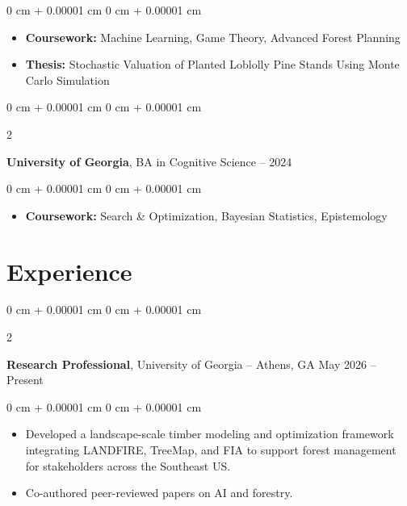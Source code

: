\documentclass[10pt, letterpaper]{article}
\newenvironment{highlights}{
    \begin{itemize}[
        topsep=0.10 cm,
        parsep=0.10 cm,
        partopsep=0pt,
        itemsep=0pt,
        leftmargin=0 cm + 10pt
    ]
}{
    \end{itemize}
} %
\newenvironment{onecolentry}{
    \begin{adjustwidth}{
        0 cm + 0.00001 cm
    }{
        0 cm + 0.00001 cm
    }
}{
    \end{adjustwidth}
} %
\newenvironment{twocolentry}[2][]{
    \onecolentry
    \def\secondColumn{#2}
    \setcolumnwidth{\fill, 4.5 cm}
    \begin{paracol}{2}
}{
    \switchcolumn \raggedleft \secondColumn
    \end{paracol}
    \endonecolentry
} %
\begin{document}
    \vspace{0.10 cm}
        \begin{onecolentry}
            \begin{highlights}
                \item \textbf{Coursework:} Machine Learning, Game Theory, Advanced Forest Planning
                \item \textbf{Thesis:} Stochastic Valuation of Planted Loblolly Pine Stands Using Monte Carlo Simulation
            \end{highlights}
        \end{onecolentry}

        \vspace{0.10 cm}
        \begin{twocolentry}{
            2020 -- 2024
        }
            \textbf{University of Georgia}, BA in Cognitive Science \end{twocolentry}  
            

        \vspace{0.10 cm}
        \begin{onecolentry}
            \begin{highlights}
                \item \textbf{Coursework:} Search \& Optimization, Bayesian Statistics, Epistemology
            \end{highlights}
        \end{onecolentry}
    \vspace{0.10 cm}

    
    \section{Experience}


        \vspace{0.2 cm}
        \begin{twocolentry}{
            May 2026 -- Present
        }
            \textbf{Research Professional}, University of Georgia -- Athens, GA\end{twocolentry}

        \vspace{0.10 cm}
        \begin{onecolentry}
            \begin{highlights}
                \item Developed a landscape-scale timber modeling and optimization framework integrating LANDFIRE, TreeMap, and FIA to support forest management for stakeholders across the Southeast US.
                \item Co-authored peer-reviewed papers on AI and forestry.
            \end{highlights}
        \end{onecolentry}
\end{document}
